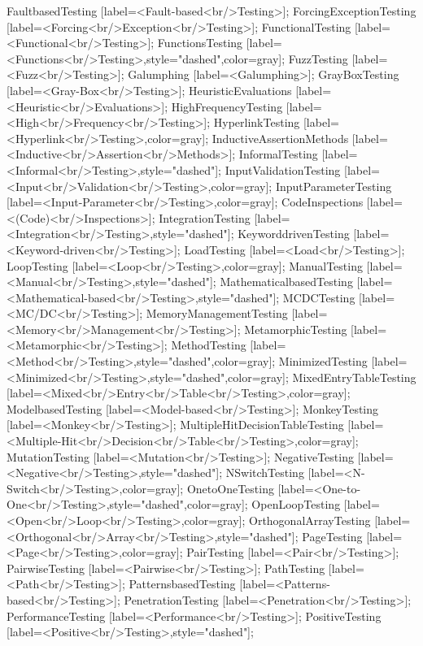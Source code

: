 \documentclass{article}
\begin{document}
{FaultbasedTesting [label=<Fault-based<br/>Testing>];
ForcingExceptionTesting [label=<Forcing<br/>Exception<br/>Testing>];
FunctionalTesting [label=<Functional<br/>Testing>];
FunctionsTesting [label=<Functions<br/>Testing>,style="dashed",color=gray];
FuzzTesting [label=<Fuzz<br/>Testing>];
Galumphing [label=<Galumphing>];
GrayBoxTesting [label=<Gray-Box<br/>Testing>];
HeuristicEvaluations [label=<Heuristic<br/>Evaluations>];
HighFrequencyTesting [label=<High<br/>Frequency<br/>Testing>];
HyperlinkTesting [label=<Hyperlink<br/>Testing>,color=gray];
InductiveAssertionMethods [label=<Inductive<br/>Assertion<br/>Methods>];
InformalTesting [label=<Informal<br/>Testing>,style="dashed"];
InputValidationTesting [label=<Input<br/>Validation<br/>Testing>,color=gray];
InputParameterTesting [label=<Input-Parameter<br/>Testing>,color=gray];
CodeInspections [label=<(Code)<br/>Inspections>];
IntegrationTesting [label=<Integration<br/>Testing>,style="dashed"];
KeyworddrivenTesting [label=<Keyword-driven<br/>Testing>];
LoadTesting [label=<Load<br/>Testing>];
LoopTesting [label=<Loop<br/>Testing>,color=gray];
ManualTesting [label=<Manual<br/>Testing>,style="dashed"];
MathematicalbasedTesting [label=<Mathematical-based<br/>Testing>,style="dashed"];
MCDCTesting [label=<MC/DC<br/>Testing>];
MemoryManagementTesting [label=<Memory<br/>Management<br/>Testing>];
MetamorphicTesting [label=<Metamorphic<br/>Testing>];
MethodTesting [label=<Method<br/>Testing>,style="dashed",color=gray];
MinimizedTesting [label=<Minimized<br/>Testing>,style="dashed",color=gray];
MixedEntryTableTesting [label=<Mixed<br/>Entry<br/>Table<br/>Testing>,color=gray];
ModelbasedTesting [label=<Model-based<br/>Testing>];
MonkeyTesting [label=<Monkey<br/>Testing>];
MultipleHitDecisionTableTesting [label=<Multiple-Hit<br/>Decision<br/>Table<br/>Testing>,color=gray];
MutationTesting [label=<Mutation<br/>Testing>];
NegativeTesting [label=<Negative<br/>Testing>,style="dashed"];
NSwitchTesting [label=<N-Switch<br/>Testing>,color=gray];
OnetoOneTesting [label=<One-to-One<br/>Testing>,style="dashed",color=gray];
OpenLoopTesting [label=<Open<br/>Loop<br/>Testing>,color=gray];
OrthogonalArrayTesting [label=<Orthogonal<br/>Array<br/>Testing>,style="dashed"];
PageTesting [label=<Page<br/>Testing>,color=gray];
PairTesting [label=<Pair<br/>Testing>];
PairwiseTesting [label=<Pairwise<br/>Testing>];
PathTesting [label=<Path<br/>Testing>];
PatternsbasedTesting [label=<Patterns-based<br/>Testing>];
PenetrationTesting [label=<Penetration<br/>Testing>];
PerformanceTesting [label=<Performance<br/>Testing>];
PositiveTesting [label=<Positive<br/>Testing>,style="dashed"];
}
\end{document}
